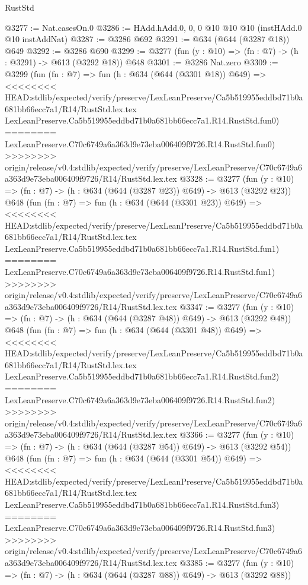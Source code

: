 \begin{lexlean}{RustStd}
\begin{coremodule}
{\begin{coremodule}
{{{{{{{{{{@3277 := Nat.casesOn.{0}
@3286 := HAdd.hAdd.{0, 0, 0} @10 @10 @10 (instHAdd.{0} @10 instAddNat)
@3287 := @3286 @692
@3291 := @634 (@644 (@3287 @18)) @649
@3292 := @3286 @690
@3299 := @3277 (fun (y : @10) => (fn : @7) -> (h : @3291) -> @613 (@3292 @18)) @648
@3301 := @3286 Nat.zero
@3309 := @3299
    (fun (fn : @7) =>
    fun (h : @634 (@644 (@3301 @18)) @649) =>
<<<<<<<< HEAD:stdlib/expected/verify/preserve/LexLeanPreserve/Ca5b519955eddbd71b0a681bb66ecc7a1/R14/RustStd.lex.tex
    LexLeanPreserve.Ca5b519955eddbd71b0a681bb66ecc7a1.R14.RustStd.fun0)
========
    LexLeanPreserve.C70c6749a6a363d9e73eba006409f9726.R14.RustStd.fun0)
>>>>>>>> origin/release/v0.4:stdlib/expected/verify/preserve/LexLeanPreserve/C70c6749a6a363d9e73eba006409f9726/R14/RustStd.lex.tex
@3328 := @3277
    (fun (y : @10) => (fn : @7) -> (h : @634 (@644 (@3287 @23)) @649) -> @613 (@3292 @23))
    @648
    (fun (fn : @7) =>
    fun (h : @634 (@644 (@3301 @23)) @649) =>
<<<<<<<< HEAD:stdlib/expected/verify/preserve/LexLeanPreserve/Ca5b519955eddbd71b0a681bb66ecc7a1/R14/RustStd.lex.tex
    LexLeanPreserve.Ca5b519955eddbd71b0a681bb66ecc7a1.R14.RustStd.fun1)
========
    LexLeanPreserve.C70c6749a6a363d9e73eba006409f9726.R14.RustStd.fun1)
>>>>>>>> origin/release/v0.4:stdlib/expected/verify/preserve/LexLeanPreserve/C70c6749a6a363d9e73eba006409f9726/R14/RustStd.lex.tex
@3347 := @3277
    (fun (y : @10) => (fn : @7) -> (h : @634 (@644 (@3287 @48)) @649) -> @613 (@3292 @48))
    @648
    (fun (fn : @7) =>
    fun (h : @634 (@644 (@3301 @48)) @649) =>
<<<<<<<< HEAD:stdlib/expected/verify/preserve/LexLeanPreserve/Ca5b519955eddbd71b0a681bb66ecc7a1/R14/RustStd.lex.tex
    LexLeanPreserve.Ca5b519955eddbd71b0a681bb66ecc7a1.R14.RustStd.fun2)
========
    LexLeanPreserve.C70c6749a6a363d9e73eba006409f9726.R14.RustStd.fun2)
>>>>>>>> origin/release/v0.4:stdlib/expected/verify/preserve/LexLeanPreserve/C70c6749a6a363d9e73eba006409f9726/R14/RustStd.lex.tex
@3366 := @3277
    (fun (y : @10) => (fn : @7) -> (h : @634 (@644 (@3287 @54)) @649) -> @613 (@3292 @54))
    @648
    (fun (fn : @7) =>
    fun (h : @634 (@644 (@3301 @54)) @649) =>
<<<<<<<< HEAD:stdlib/expected/verify/preserve/LexLeanPreserve/Ca5b519955eddbd71b0a681bb66ecc7a1/R14/RustStd.lex.tex
    LexLeanPreserve.Ca5b519955eddbd71b0a681bb66ecc7a1.R14.RustStd.fun3)
========
    LexLeanPreserve.C70c6749a6a363d9e73eba006409f9726.R14.RustStd.fun3)
>>>>>>>> origin/release/v0.4:stdlib/expected/verify/preserve/LexLeanPreserve/C70c6749a6a363d9e73eba006409f9726/R14/RustStd.lex.tex
@3385 := @3277
    (fun (y : @10) => (fn : @7) -> (h : @634 (@644 (@3287 @88)) @649) -> @613 (@3292 @88))
}}}}}}}}}}
\end{coremodule}}
\end{coremodule}
\end{lexlean}
